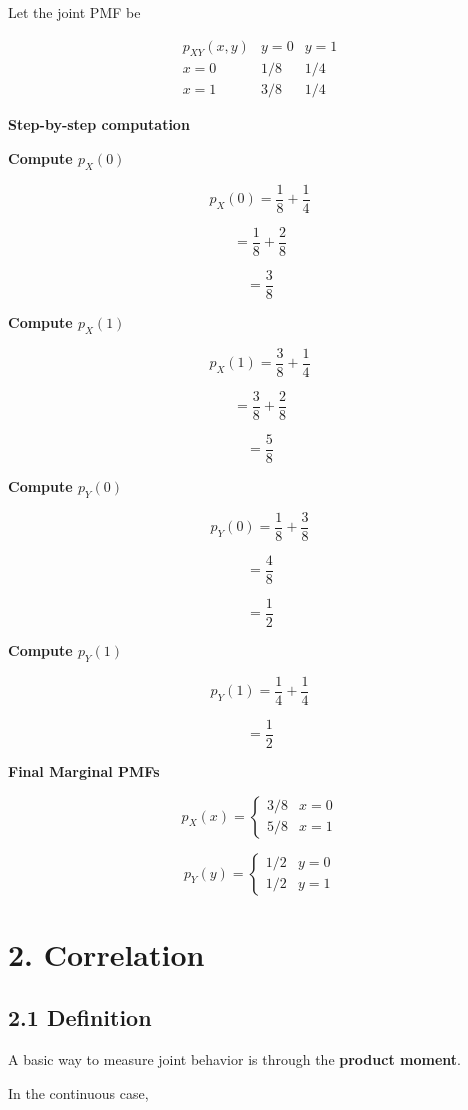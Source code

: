 \documentclass[12pt]{article}
\begin{document}
Let the joint PMF be

\[
\begin{array}{c|cc}
p_{XY}(x,y) & y=0 & y=1\\
\hline
x=0 & 1/8 & 1/4\\
x=1 & 3/8 & 1/4
\end{array}
\]

\textbf{Step-by-step computation}

\textbf{Compute $p_X(0)$}

\[
p_X(0) = \frac{1}{8} + \frac{1}{4}
\]

\[
= \frac{1}{8} + \frac{2}{8}
\]

\[
= \frac{3}{8}
\]

\textbf{Compute $p_X(1)$}

\[
p_X(1) = \frac{3}{8} + \frac{1}{4}
\]

\[
= \frac{3}{8} + \frac{2}{8}
\]

\[
= \frac{5}{8}
\]

\textbf{Compute $p_Y(0)$}

\[
p_Y(0) = \frac{1}{8} + \frac{3}{8}
\]

\[
= \frac{4}{8}
\]

\[
= \frac{1}{2}
\]

\textbf{Compute $p_Y(1)$}

\[
p_Y(1) = \frac{1}{4} + \frac{1}{4}
\]

\[
= \frac{1}{2}
\]

\textbf{Final Marginal PMFs}

\[
p_X(x)=
\begin{cases}
3/8 & x=0\\
5/8 & x=1
\end{cases}
\]

\[
p_Y(y)=
\begin{cases}
1/2 & y=0\\
1/2 & y=1
\end{cases}
\]

\section*{2. Correlation}

\subsection*{2.1 Definition}

A basic way to measure joint behavior is through the \textbf{product moment}.

In the continuous case,
\end{document}

